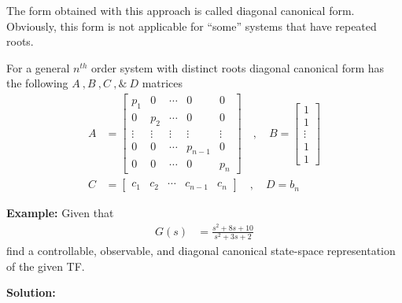 \documentclass[twoside]{article}
\begin{document}
The form obtained with this approach is called
diagonal canonical form. Obviously, this form is
not applicable for ``some'' systems that have repeated roots.

For a general $n^{th}$ order system with distinct
roots diagonal canonical form has the following 
$A \ ,  B \ ,  C \ , \& \ D$ matrices
%
\begin{align*}
A &= \left[ \begin{array}{ccccc} p_1 & 0 & \cdots & 0 & 0
              \\ 0 & p_2 & \cdots & 0 & 0
\\ \vdots & \vdots & \vdots & \vdots & \vdots
\\ 0 & 0 & \cdots & p_{n-1} & 0
    \\ 0 & 0 & \cdots & 0 & p_n \end{array} \right]
\quad , \quad 
B = \left[ \begin{array}{c} 1 \\ 1 \\ \vdots \\ 1 \\  1
\end{array} \right]
\\ C &= \left[ \begin{array}{ccccc} c_1 & c_2 & \cdots &  c_{n-1} & c_n \end{array} \right]
\quad , \quad
D = b_n
\end{align*}

\newpage

\textbf{Example:} Given that
%
\begin{align*}
G(s) &= \frac{s^2 + 8 s + 10}{s^2 + 3 s + 2}
\end{align*}
%
find a controllable, observable, and  diagonal canonical state-space representation of the given TF.

\vspace{6pt}

\textbf{Solution:}
\end{document}
